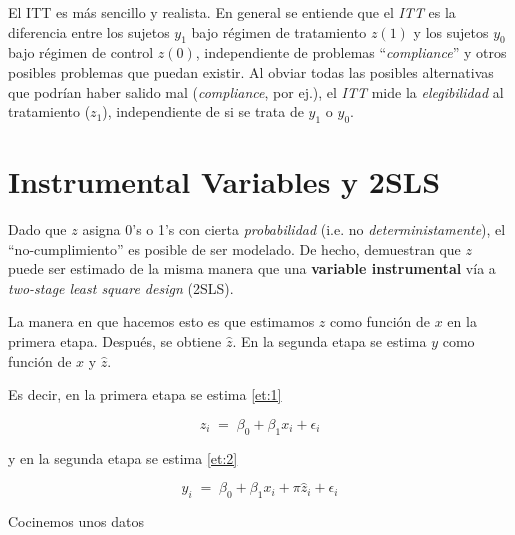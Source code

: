 \documentclass[onesided]{article}\usepackage[]{graphicx}\usepackage[]{color}
\begin{document}
El ITT es m\'as sencillo y realista. En general se entiende que el \emph{ITT} es la diferencia entre los sujetos $y_{1}$ bajo r\'egimen de tratamiento $z(1)$ y los sujetos $y_{0}$ bajo r\'egimen de control $z(0)$, independiente de problemas ``\emph{compliance}'' y otros posibles problemas que puedan existir. Al obviar todas las posibles alternativas que podr\'ian haber salido mal (\emph{compliance}, por ej.), el \emph{ITT} mide la \emph{elegibilidad} al tratamiento ($z_{1}$), independiente de si se trata de $y_{1}$ o $y_{0}$.


\section{Instrumental Variables y 2SLS}

Dado que $z$ asigna 0's o 1's con cierta \emph{probabilidad} (i.e. no \emph{deterministamente}), el ``no-cumplimiento'' es posible de ser modelado. De hecho, \textcite[]{Hahn2001a} demuestran que $z$ puede ser estimado de la misma manera que una {\bf variable instrumental} v\'ia a \emph{two-stage least square design} (2SLS). 

La manera en que hacemos esto es que estimamos $z$ como funci\'on de $x$ en la primera etapa. Despu\'es, se obtiene $\hat z$. En la segunda etapa se estima $y$ como funci\'on de $x$ y $\hat z$.

Es decir, en la primera etapa se estima \autoref{et:1}

\begin{equation}\label{et:1}
z_{i} \;=\; \beta_{0} + \beta_{1}x_{i} + \epsilon_{i}
\end{equation}

y en la segunda etapa se estima \autoref{et:2}

\begin{equation}\label{et:2}
y_{i} \;=\; \beta_{0} + \beta_{1}x_{i} + \pi \hat z_{i} + \epsilon_{i}
\end{equation}


Cocinemos unos datos
\end{document}
